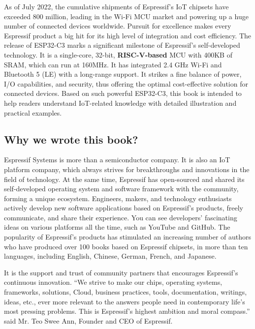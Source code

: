 \documentclass[a4paper,12pt]{book}
\begin{document}
As of July 2022, the cumulative shipments of Espressif’s IoT chipsets have exceeded 800 million, leading in the Wi-Fi MCU market and powering up a huge number of connected devices worldwide. Pursuit for excellence makes every Espressif product a big hit for its high level of integration and cost efficiency. The release of ESP32-C3 marks a significant milestone of Espressif’s self-developed technology. It is a single-core, 32-bit, \textbf{RISC-V-based} MCU with 400KB of SRAM, which can run at 160MHz. It has integrated 2.4 GHz Wi-Fi and Bluetooth 5 (LE) with a long-range support. It strikes a fine balance of power, I/O capabilities, and security, thus offering the optimal cost-effective solution for connected devices. Based on such powerful ESP32-C3, this book is intended to help readers understand IoT-related knowledge with detailed illustration and practical examples.

\subsection*{Why we wrote this book?}
Espressif Systems is more than a semiconductor company. It is also an IoT platform company, which always strives for breakthroughs and innovations in the field of technology. At the same time, Espressif has open-sourced and shared its self-developed operating system and software framework with the community, forming a unique ecosystem. Engineers, makers, and technology enthusiasts actively develop new software applications based on Espressif’s products, freely communicate, and share their experience. You can see developers’ fascinating ideas on various platforms all the time, such as YouTube and GitHub. The popularity of Espressif’s products has stimulated an increasing number of authors who have produced over 100 books based on Espressif chipsets, in more than ten languages, including English, Chinese, German, French, and Japanese.

It is the support and trust of community partners that encourages Espressif's continuous innovation. “We strive to make our chips, operating systems, frameworks, solutions, Cloud, business practices, tools, documentation, writings, ideas, etc., ever more relevant to the answers people need in contemporary life’s most pressing problems. This is Espressif’s highest ambition and moral compass.” said Mr. Teo Swee Ann, Founder and CEO of Espressif.
\end{document}
